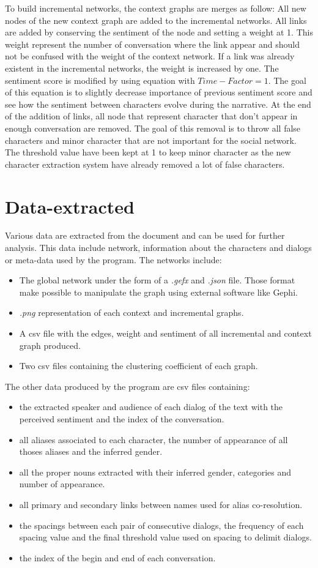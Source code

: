\documentclass[a4paper, 12pt]{report}
\begin{document}
To build incremental networks, the context graphs are merges as follow: All new nodes of the new context graph are added to the incremental networks. All links are added by conserving the sentiment of the node and setting a weight at 1. This weight represent the number of conversation where the link appear and should not be confused with the weight of the context network. If a link was already existent in the incremental networks, the weight is increased by one. The sentiment score is modified by using equation \cite{equation} with $Time-Factor = 1$. The goal of this equation is to slightly decrease importance of previous sentiment score and see how the sentiment between characters evolve during the narrative. At the end of the addition of links, all node that represent character that don't appear in enough conversation are removed. The goal of this removal is to throw all false characters and minor character that are not important for the social network. The threshold value have been kept at 1 to keep minor character as the new character extraction system have already removed a lot of false characters.

\newpage
\section{Data-extracted}
Various data are extracted from the document and can be used for further analysis. This data include network, information about the characters and dialogs or meta-data used by the program.
The networks include:
\begin{itemize}
\item The global network under the form of a \textit{.gefx} and \textit{.json} file. Those format make possible to manipulate the graph using external software like Gephi.
\item \textit{.png} representation of each context and incremental graphs.
\item A csv file with the edges, weight and sentiment of all incremental and context graph produced.
\item Two csv files containing the clustering coefficient of each graph.
\end{itemize}
The other data produced by the program are csv files containing:
\begin{itemize}
\item the extracted speaker and audience of each dialog of the text with the perceived sentiment and the index of the conversation.
\item all aliases associated to each character, the number of appearance of all thoses aliases and the inferred gender.
\item all the proper nouns extracted with their inferred gender, categories and number of appearance.
\item all primary and secondary links between names used for alias co-resolution.
\item the spacings between each pair of consecutive dialogs, the frequency of each spacing value and the final threshold value used on spacing to delimit dialogs.
\item the index of the begin and end of each conversation.
\end{itemize}
\end{document}
